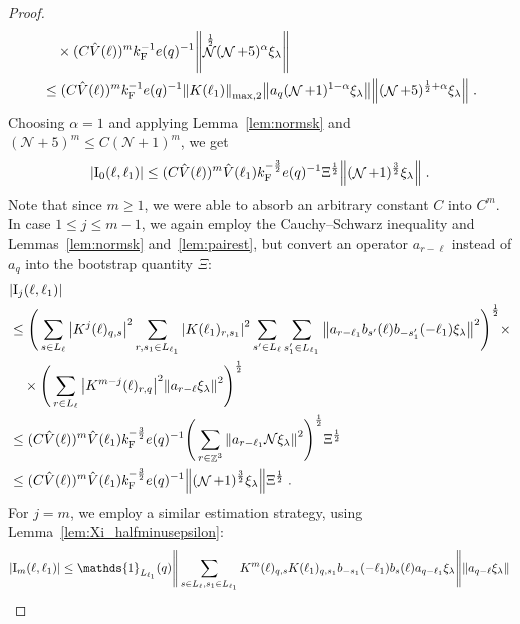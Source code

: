 \documentclass[12pt,a4paper]{article}
\numberwithin{equation}{section}
\newcommand{\cN}{\mathcal{N}}
\newcommand{\1}{\mathbb{I}}
\newcommand{\F}{\mathrm{F}}
\newcommand{\I}{\mathrm{I}}
\DeclareMathOperator{\Z}{\mathbb{Z}}
\DeclareMathOperator{\NN}{\mathcal{N}}
\newcommand{\half}{\frac{1}{2}}
\theoremstyle{plain}
\theoremstyle{definition}
\theoremstyle{remark}
\theoremstyle{plain}
\theoremstyle{definition}
\theoremstyle{remark}
\begin{document}
\begin{proof}
\begin{align}
	& \quad \times (C \hat{V}(\ell))^m k_{\F}^{-1} e(q)^{-1} \norm{ \NN^\half(\NN+5)^{\alpha}\xi_\lambda } \nonumber\\
	&\leq (C \hat{V}(\ell))^m k_{\F}^{-1} e(q)^{-1}  \norm{K(\ell_1)}_{\mathrm{max,2}} \norm{ a_{q}(\NN+1)^{1-\alpha}\xi_\lambda} \norm{ (\NN+5)^{\half+\alpha}\xi_\lambda } \nonumber \;.\\
\end{align}
Choosing $\alpha = 1$ and applying Lemma~\ref{lem:normsk} and $ (\cN+5)^m \le C (\cN+1)^m $, we get
\begin{equation}
	 |\I_0(\ell, \ell_1)|
	 \leq (C \hat{V}(\ell))^m
	 	\hat{V}(\ell_1)
	 	k_{\F}^{-\frac{3}{2}} e(q)^{-1} \Xi^\half
	 	\norm { (\NN+1)^{\frac{3}{2}} \xi_\lambda } \;. \label{eq:estEQ1111} 
\end{equation}
Note that since $ m \ge 1 $, we were able to absorb an arbitrary constant $ C $ into $ C^m $.
In case $ 1 \le j \le m-1 $, we again employ the Cauchy--Schwarz inequality and Lemmas~\ref{lem:normsk} and~\ref{lem:pairest}, but convert an operator $ a_{r-\ell} $ instead of $ a_q $ into the bootstrap quantity $ \Xi $:
\begin{align}
	&|\I_j(\ell, \ell_1)| \nonumber\\
	&\leq \Bigg( \sum_{s \in L_\ell} \abs{K^j(\ell)_{q,s}}^2
		\sum_{r, s_1 \in L_{\ell_1}} \abs{K(\ell_1)_{r,s_1}}^2
		\sum_{s' \in L_\ell} \sum_{s_1' \in L_{\ell_1}} \norm{a_{r-\ell_1} b_{s'}(\ell) b_{-s_1'}(-\ell_1) \xi_\lambda}^2 \Bigg)^\half \times \nonumber\\
	&\quad \times \Bigg( \sum_{r\in L_{\ell}} \abs{K^{m-j}(\ell)_{r,q}}^2 \norm{a_{r-\ell} \xi_\lambda }^2 \Bigg)^\half\nonumber\\
	&\leq (C \hat{V}(\ell))^m \hat{V}(\ell_1) k_{\F}^{-\frac 32} e(q)^{-1}
		\Bigg( \sum_{r \in \Z^3} \norm{a_{r-\ell_1} \cN \xi_\lambda}^2 \Bigg)^\half \Xi^\half \nonumber\\
	&\leq (C \hat{V}(\ell))^m
		\hat{V}(\ell_1)
		k_{\F}^{-\frac 32} e(q)^{-1}
		\norm{(\NN+1)^\frac{3}{2} \xi_\lambda} \Xi^\half \;. \label{eq:estEQ1112}
\end{align}
For $ j = m $, we employ a similar estimation strategy, using Lemma~\ref{lem:Xi_halfminusepsilon}:
\begin{align}
	|\I_m(\ell, \ell_1)|
	&\leq \mathds{1}_{L_{\ell_1}}(q)
		\Bigg\Vert \sum_{s\in L_{\ell}, s_1 \in L_{\ell_1}} K^m(\ell)_{q,s}K(\ell_1)_{q,s_1} b_{-s_1}(-\ell_1) b_{s}(\ell) a_{q-\ell_1}\xi_\lambda \Bigg\Vert
		\norm{ a_{q-\ell}\xi_\lambda }\nonumber\\

\end{align}
\end{proof}
\end{document}
